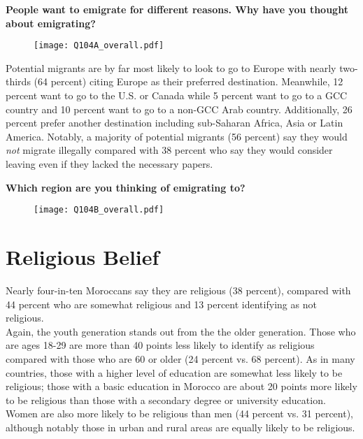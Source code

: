 \documentclass[12pt]{article}
\begin{document}
			\begin{center}
		{\textbf{People want to emigrate for different reasons. Why have you thought about emigrating?}}
		\begin{figure}[H]
			\centering
			\texttt{[image: Q104A\_overall.pdf]}
		\end{figure}
	\end{center}

	\noindent Potential migrants are by far most likely to look to go to Europe with nearly two-thirds (64 percent) citing Europe as their preferred destination. Meanwhile, 12 percent want to go to the U.S. or Canada while 5 percent want to go to a GCC country and 10 percent want to go to a non-GCC Arab country. Additionally, 26 percent prefer another destination including sub-Saharan Africa, Asia or Latin America. Notably, a majority of potential migrants (56 percent) say they would \textit{not} migrate illegally compared with 38 percent who say they would consider leaving even if they lacked the necessary papers.

		\begin{center}
		{\textbf{Which region are you thinking of emigrating to?}}\\
		\begin{figure}[H]
			\centering
			\texttt{[image: Q104B\_overall.pdf]}
		\end{figure}
	\end{center}

\section*{Religious Belief}
	
	\noindent Nearly four-in-ten Moroccans say they are religious (38 percent), compared with 44 percent who are somewhat religious and 13 percent identifying as not religious. \\
	
	\noindent Again, the youth generation stands out from the the older generation. Those who are ages 18-29 are more than 40 points less likely to identify as religious compared with those who are 60 or older (24 percent vs. 68 percent). As in many countries, those with a higher level of education are somewhat less likely to be religious; those with a basic education in Morocco are about 20 points more likely to be religious than those with a secondary degree or university education. Women are also more likely to be religious than men (44 percent vs. 31 percent), although notably those in urban and rural areas are equally likely to be religious.
	
\end{document}
